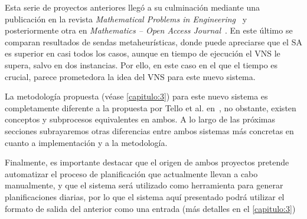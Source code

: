 Esta serie de proyectos anteriores llegó a su culminación mediante una publicación en la revista \textit{Mathematical Problems in Engineering}~\cite{articulo1} y posteriormente otra en \textit{Mathematics -- Open Access Journal}~\cite{articulo2}. 
En este último se comparan resultados de sendas metaheurísticas, donde puede apreciarse que el SA es superior en casi todos los casos, aunque en tiempo de ejecución el VNS le supera, salvo en dos instancias. Por ello, en este caso en el que el tiempo es crucial, parece prometedora la idea del VNS para este nuevo sistema. 

La metodología propuesta (véase \autoref{capitulo:3}) para este nuevo sistema es completamente diferente a la propuesta por Tello et al. en~\cite{articulo1}, no obstante, existen conceptos y subprocesos equivalentes en ambos. 
A lo largo de las próximas secciones subrayaremos otras diferencias entre ambos sistemas más concretas en cuanto a implementación y a la metodología.

Finalmente, es importante destacar que el origen de ambos proyectos pretende automatizar el proceso de planificación que actualmente llevan a cabo manualmente, y que el sistema \legacy{} será utilizado como herramienta para generar planificaciones diarias, por lo que el sistema aquí presentado podrá utilizar el formato de salida del anterior como una entrada (más detalles en el \autoref{capitulo:3}) 



